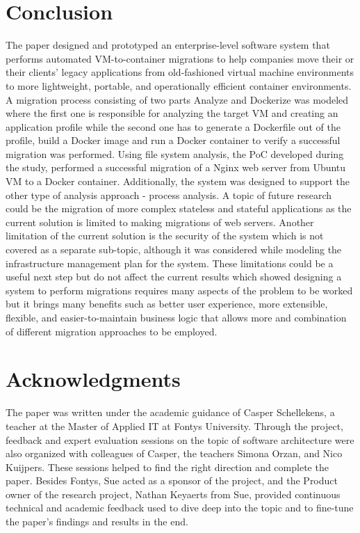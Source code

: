 \documentclass[twocolumn]{article}
\begin{document}
\section{Conclusion}
The paper designed and prototyped an enterprise-level software system that performs automated VM-to-container migrations to help companies move their or their clients' legacy applications from old-fashioned virtual machine environments to more lightweight, portable, and operationally efficient container environments. A migration process consisting of two parts Analyze and Dockerize was modeled where the first one is responsible for analyzing the target VM and creating an application profile while the second one has to generate a Dockerfile out of the profile, build a Docker image and run a Docker container to verify a successful migration was performed. Using file system analysis, the PoC developed during the study, performed a successful migration of a Nginx web server from Ubuntu VM to a Docker container. Additionally, the system was designed to support the other type of analysis approach - process analysis. A topic of future research could be the migration of more complex stateless and stateful applications as the current solution is limited to making migrations of web servers. Another limitation of the current solution is the security of the system which is not covered as a separate sub-topic, although it was considered while modeling the infrastructure management plan for the system. These limitations could be a useful next step but do not affect the current results which showed designing a system to perform migrations requires many aspects of the problem to be worked but it brings many benefits such as better user experience, more extensible, flexible, and easier-to-maintain business logic that allows more and combination of different migration approaches to be employed.

\section{Acknowledgments}
The paper was written under the academic guidance of Casper Schellekens, a teacher at the Master of Applied IT at Fontys University. Through the project, feedback and expert evaluation sessions on the topic of software architecture were also organized with colleagues of Casper, the teachers Simona Orzan, and Nico Kuijpers. These sessions helped to find the right direction and complete the paper. Besides Fontys, Sue acted as a sponsor of the project, and the Product owner of the research project, Nathan Keyaerts from Sue, provided continuous technical and academic feedback used to dive deep into the topic and to fine-tune the paper's findings and results in the end.
\end{document}
